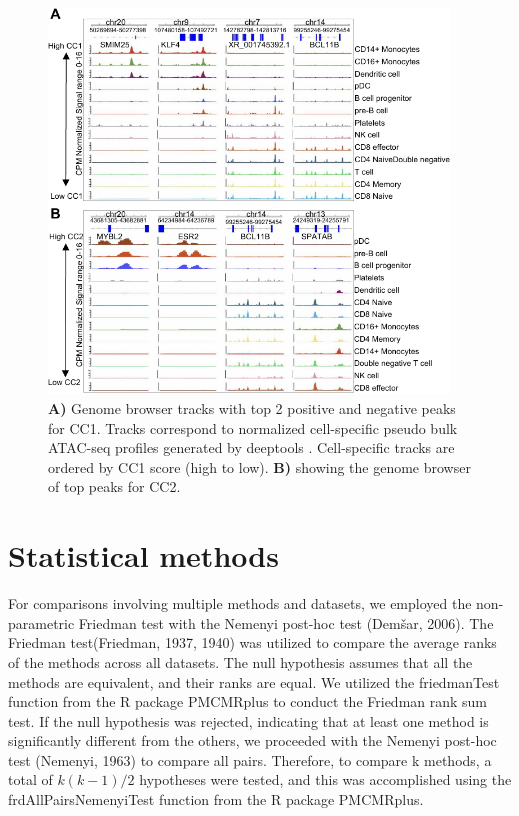 \begin{figure}[!ht]
	\centering
	\includegraphics[width=0.95\textwidth]{CC_Peaks/fig}
	\vspace{0.1cm}
	\caption[Genome browser tracks of top 2 positive and negative peaks for CC1 and CC2.]{ \textbf{A)} Genome browser tracks with top 2 positive and negative peaks for CC1. Tracks correspond to normalized cell-specific pseudo bulk ATAC-seq profiles generated by deeptools \citep{ramirez2016deeptools2}. Cell-specific tracks are ordered by CC1 score (high to low). \textbf{B)} showing the genome browser of top peaks for CC2.}
	\label{fig:CC_Peaks}
\end{figure}

\section{Statistical methods}
For comparisons involving multiple methods and datasets, we employed the non-parametric Friedman test with the Nemenyi post-hoc test (Demšar, 2006). The Friedman test(Friedman, 1937, 1940) was utilized to compare the average ranks of the methods across all datasets. The null hypothesis assumes that all the methods are equivalent, and their ranks are equal. We utilized the friedmanTest function from the R package PMCMRplus to conduct the Friedman rank sum test. If the null hypothesis was rejected, indicating that at least one method is significantly different from the others, we proceeded with the Nemenyi post-hoc test (Nemenyi, 1963) to compare all pairs. Therefore, to compare k methods, a total of $k(k-1)/2$ hypotheses were tested, and this was accomplished using the frdAllPairsNemenyiTest function from the R package PMCMRplus.

